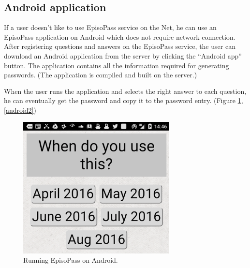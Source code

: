 \documentclass{article}
\begin{document}

\subsection{Android application}



If a user doesn't like to use EpisoPass service on the Net,
he can use an EpisoPass application on Android
which does not require network connection.
After registering questions and answers on the EpisoPass service,
the user can download an Android application from the server
by clicking the ``Android app'' button.
The application contains all the information required for generating passwords.
(The application is compiled and built on the server.)


When the user runs the application and selects the right answer
to each question, he can eventually get the password and copy it to the password entry.
(Figure \ref{android1},\ref{android2})

\begin{figure}[H]
\includegraphics[width=80mm,bb=-30 0 399 386]{figures/429eec261024dc6c85351f51c12f09b4.png}
\caption{Running EpisoPass on Android.}
\label{android1}
\end{figure}
\end{document}
